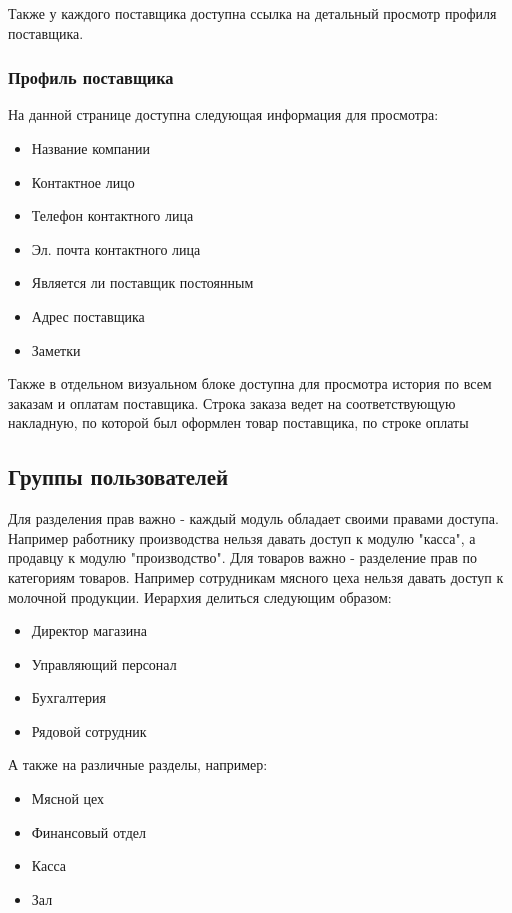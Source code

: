 \documentclass[DIV=calc, paper=a4, fontsize=11pt]{scrartcl} %
\begin{document}
Также у каждого поставщика доступна ссылка на детальный просмотр профиля поставщика.

\subsubsection{Профиль поставщика}

На данной странице доступна следующая информация для просмотра:

\begin{itemize}
	\item Название компании
	\item Контактное лицо
	\item Телефон контактного лица
	\item Эл. почта контактного лица
	\item Является ли поставщик постоянным
	\item Адрес поставщика
	\item Заметки
\end{itemize}

Также в отдельном визуальном блоке доступна для просмотра история по всем заказам и оплатам поставщика. Строка заказа ведет на соответствующую накладную, по которой был оформлен товар поставщика, по строке оплаты 


\subsection{Группы пользователей}

Для разделения прав важно - каждый модуль обладает своими правами доступа. Например работнику производства нельзя давать доступ к модулю "касса", а продавцу к модулю "производство".
Для товаров важно - разделение прав по категориям товаров. Например сотрудникам мясного цеха нельзя давать доступ к молочной продукции.
Иерархия делиться следующим образом:

\begin{itemize}
	\item Директор магазина
	\item Управляющий персонал
	\item Бухгалтерия
	\item Рядовой сотрудник
\end{itemize}

А также на различные разделы, например:

\begin{itemize}
	\item Мясной цех
	\item Финансовый отдел
	\item Касса
	\item Зал
\end{itemize}
\end{document}
